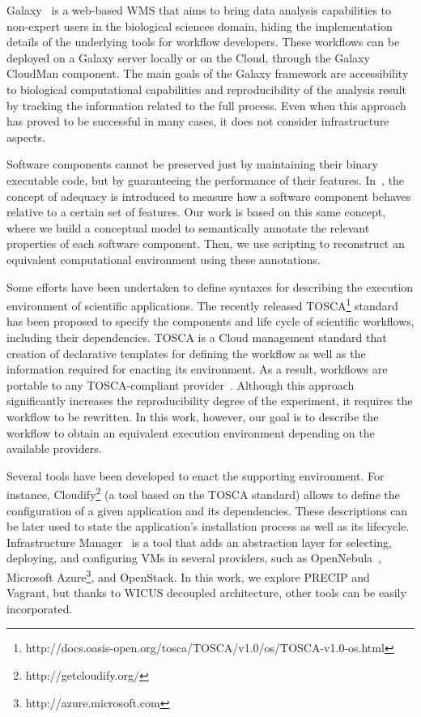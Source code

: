 Galaxy~\cite{goecks2010galaxy} is a web-based WMS that aims to bring data 
analysis capabilities to non-expert users in the biological sciences domain, hiding the 
implementation  details of the underlying tools for workflow developers. These 
workflows can be deployed on a Galaxy server locally or on the Cloud, through 
the Galaxy  CloudMan component. The main goals of the Galaxy framework 
are accessibility to biological computational  capabilities and reproducibility of the
analysis result by tracking the information  related to the full process. 
Even when this approach has proved to be successful in many cases,
it does not consider infrastructure aspects.

Software components cannot be preserved just by maintaining their binary executable code, but by guaranteeing the performance of their features. In~\cite{Matthews}, the concept of adequacy is introduced to measure how a software component behaves relative to a certain set of features. Our work is based on this same concept, where we build a conceptual model to semantically annotate the relevant properties of each software component. Then, we use scripting to reconstruct an equivalent computational environment using these annotations.

Some efforts have been undertaken to define syntaxes for describing the 
execution environment of scientific applications. The recently released 
TOSCA\footnote{http://docs.oasis-open.org/tosca/TOSCA/v1.0/os/TOSCA-v1.0-os.html} 
standard has been proposed to specify the components and life cycle of 
scientific workflows, including their dependencies. TOSCA is a Cloud 
management standard that creation of declarative templates 
for defining the workflow as well as the information required for enacting 
its environment. As a result, workflows are portable to any TOSCA-compliant 
provider~\cite{TOSCA}. Although this approach significantly increases the 
reproducibility degree of the experiment, it requires the workflow to be
rewritten. In this work, however, our goal is to describe the workflow to 
obtain an equivalent execution environment depending on the available 
providers.

Several tools have been developed to enact the supporting environment.
For instance, Cloudify\footnote{http://getcloudify.org/} (a tool based on the
TOSCA standard) allows to define the configuration of a given application 
and its dependencies. These descriptions can be later used to state the 
application's installation process as well as its lifecycle. Infrastructure 
Manager~\cite{IM2015} is a tool that adds an abstraction layer for selecting, 
deploying, and configuring VMs in several providers, such as OpenNebula~\cite{opennebula}, 
Microsoft Azure\footnote{http://azure.microsoft.com}, and OpenStack. In
this work, we explore PRECIP and Vagrant, but thanks to WICUS decoupled
architecture, other tools can be easily incorporated.

